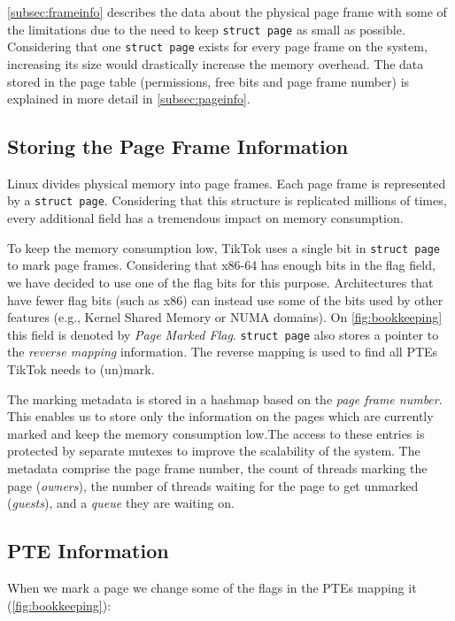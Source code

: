 \documentclass[conference]{IEEEtran}
\newcommand{\sysname}{TikTok}
\begin{document}
\autoref{subsec:frameinfo} describes the data about the
physical page frame with some of the limitations due to the need to keep
\texttt{struct page} as small as possible. Considering that one \texttt{struct
page} exists for every page frame on the system, increasing its size would
drastically increase the memory overhead.  The data stored in the page table
(permissions, free bits and page frame number) is explained in more detail in
\autoref{subsec:pageinfo}.

\subsection{Storing the Page Frame Information}
\label{subsec:frameinfo}
Linux divides physical memory into page frames. Each page frame is represented
by a \texttt{struct page}. Considering that this structure is replicated
millions of times, every additional field has a tremendous impact on memory
consumption.

To keep the memory consumption low, \sysname{} uses a single bit in \texttt{struct
page} to mark page frames. Considering that x86-64 has enough bits in the flag
field, we have decided to use one of the flag bits for this purpose.
Architectures that have fewer flag bits (such as x86) can instead use some of
the bits used by other features (e.g., Kernel Shared Memory or NUMA domains). On
\autoref{fig:bookkeeping} this field is denoted by \emph{Page Marked Flag}.
\texttt{struct page} also stores a pointer to the \emph{reverse mapping}
information. The reverse mapping is used to find all PTEs \sysname{} needs to
(un)mark.

The marking metadata is stored in a hashmap based on the \emph{page frame
number}. This enables us to store only the information on the pages which are
currently marked and keep the memory consumption low.The access to these entries
is protected by separate mutexes to improve the scalability of the system. The
metadata comprise the page frame number, the count of threads marking the page
(\emph{owners}), the number of threads waiting for the page to get unmarked
(\emph{guests}), and a \emph{queue} they are waiting on. 

\subsection{PTE Information}
\label{subsec:pageinfo}

When we mark a page we change some of the flags in the PTEs mapping it
(\autoref{fig:bookkeeping}):
\end{document}
